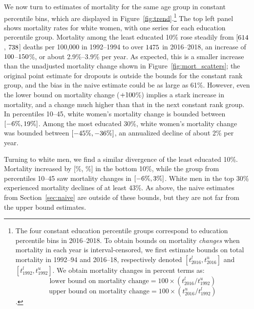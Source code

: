 \documentclass[12pt,letterpaper]{article}
\numberwithin{equation}{section}
\begin{document}
We now turn to estimates of mortality for the same age group in constant percentile bins, which are displayed in Figure~\ref{fig:trend}.\footnote{The four constant education percentile groups correspond to education percentile bins in 2016--2018. To obtain bounds on mortality \textit{changes} when mortality in each year is interval-censored, we first estimate bounds on total mortality in 1992--94 and 2016--18, respectively denoted $[t^l_{2016}, t^u_{2016}]$ and $[t^l_{1992}, t^u_{1992}]$.  We obtain mortality changes in percent terms as:
$$ \text{lower bound on mortality change} = 100 \times \left(t^l_{2016} / t^u_{1992} \right) $$
$$ \text{upper bound on mortality change} = 100 \times \left(t^u_{2016} / t^l_{1992} \right) $$.} The top left panel shows mortality rates for white women, with one series for each education percentile group.  Mortality among the least educated 10\% rose steadily from [$614$, $738$] deaths per 100,000 in 1992--1994 to over $1475$ in 2016--2018, an increase of $100$--$150$\%, or about 2.9\%--3.9\% per year. As expected, this is a smaller increase than the unadjusted mortality change shown in Figure~\ref{fig:mort_scatters}; the original point estimate for dropouts is outside the bounds for the constant rank group, and the bias in the naive estimate could be as large as 61\%. However, even the lower bound on mortality change ($+100$\%) implies a stark increase in mortality, and a change much higher than that in the next constant rank group. In percentiles 10--45, white women's mortality change is bounded between $[ -6\%, 19\% ] $. Among the most educated 30\%, white women's mortality change was bounded between $[-45\%, -36\%]$, an annualized decline of about 2\% per year.

Turning to white men, we find a similar divergence of the least educated 10\%. Mortality increased by [\lbtotalsexchangelesshswhitemalemiddle\%, \ubtotalsexchangelesshswhitemalemiddle\%] in the bottom 10\%, while the group from percentiles 10--45 saw mortality changes in $[-6\%,3\%]$. White men in the top 30\% experienced mortality declines of at least 43\%. As above, the naive estimates from Section~\ref{sec:naive} are outside of these bounds, but they are not far from the upper bound estimates.
\end{document}
